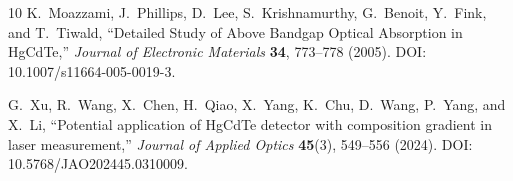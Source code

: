 \documentclass[11pt]{article}
\begin{document}
\begin{thebibliography}{10}
K.~Moazzami, J.~Phillips, D.~Lee, S.~Krishnamurthy, G.~Benoit, Y.~Fink, and T.~Tiwald, ``Detailed Study of Above Bandgap Optical Absorption in HgCdTe,'' \emph{Journal of Electronic Materials} \textbf{34}, 773--778 (2005). DOI: 10.1007/s11664-005-0019-3.

G.~Xu, R.~Wang, X.~Chen, H.~Qiao, X.~Yang, K.~Chu, D.~Wang, P.~Yang, and X.~Li, ``Potential application of HgCdTe detector with composition gradient in laser measurement,'' \emph{Journal of Applied Optics} \textbf{45}(3), 549--556 (2024). DOI: 10.5768/JAO202445.0310009.

\end{thebibliography}
\end{document}
